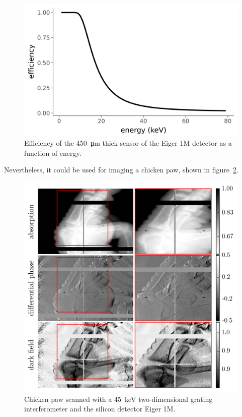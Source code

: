 \begin{figure}[htb]
    \centering
    \includegraphics[width=\textwidth]{gfx/eiger/efficiency.png}
    \caption{Efficiency of the \SI{450}{\micro\meter} thick sensor of the
Eiger 1M detector as a function of energy.}
    \label{fig:eiger-efficiency}
\end{figure}

Nevertheless, it could be used for imaging a chicken paw, shown in
figure~\ref{fig:eiger-chicken}.

\begin{figure}[htb]
    \centering
    \includegraphics[width=\textwidth]{gfx/eiger/series_160729_170729669658_series_160729_171501073073.png}
    \caption{Chicken paw scanned with a \SI{45}{\kilo\eV} two-dimensional
grating interferometer and the silicon detector Eiger 1M.}
    \label{fig:eiger-chicken}
\end{figure}

